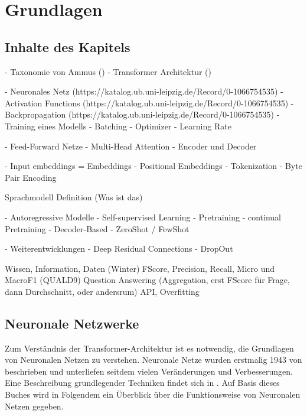 \chapter{Grundlagen}\label{ch:preliminaries}




\section*{Inhalte des Kapitels}
- Taxonomie von Ammus (\citet{ammus}) %
- Transformer Architektur (\citet{attention}) %

- Neuronales Netz (https://katalog.ub.uni-leipzig.de/Record/0-1066754535) %
- Activation Functions (https://katalog.ub.uni-leipzig.de/Record/0-1066754535) %
- Backpropagation (https://katalog.ub.uni-leipzig.de/Record/0-1066754535)%
- Training eines Modells %
    - Batching %
    - Optimizer %
    - Learning Rate %

- Feed-Forward Netze
- Multi-Head Attention
- Encoder und Decoder

- Input embeddings = Embeddings
- Positional Embeddings
- Tokenization %
    - Byte Pair Encoding %


Sprachmodell Definition (Was ist das)

- Autoregressive Modelle
    - Self-supervised Learning %
    - Pretraining
    - continual Pretraining
    - Decoder-Based
    - ZeroShot / FewShot

- Weiterentwicklungen
    - Deep Residual Connections %
    - DropOut   %

Wissen, Information, Daten (Winter)
FScore, Precision, Recall, Micro und MacroF1 (QUALD9)
Question Answering (Aggregation, erst FScore für Frage, dann Durchschnitt, oder andersrum)
API, Overfitting

\section{Neuronale Netzwerke}
Zum Verständnis der Transformer-Architektur ist es notwendig, die Grundlagen von Neuronalen Netzen zu verstehen.
Neuronale Netze wurden erstmalig 1943 von \citet{neuronal_networks_first} beschrieben und unterliefen seitdem vielen Veränderungen und Verbesserungen.
Eine Beschreibung grundlegender Techniken findet sich in \citet{neuronale-netze}. Auf Basis dieses Buches wird in Folgendem ein Überblick über die Funktionsweise von Neuronalen Netzen gegeben.\\

